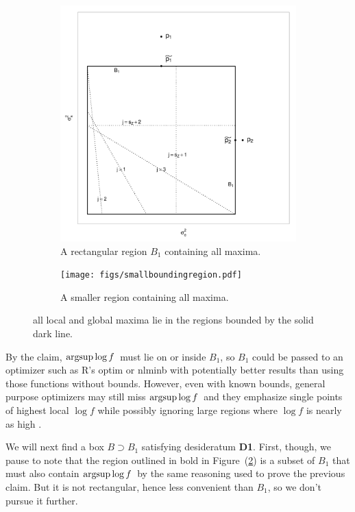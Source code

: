 \documentclass[ejs]{imsart}
\newcommand{\textcompute}{\textsf}
\newcommand{\R}{\textcompute{R}\xspace}
\newcommand{\RL}{f}
\newcommand{\logRL}{\log\RL}
\newcommand{\mrle}{$\argsup\log f$}
\newcommand{\argsup}{\operatornamewithlimits{argsup}}
\begin{document}
\begin{figure}[h]
  \begin{subfigure}{.5\textwidth}
	\centering
	\includegraphics[width=.8\linewidth]{figs/boundingbox.pdf}
	\caption{A rectangular region $B_1$ containing all maxima.}
	\label{fig:bigboundingbox}
  \end{subfigure}
  \begin{subfigure}{.5\textwidth}
	\centering
	\texttt{[image: figs/smallboundingregion.pdf]}
	\caption{A smaller region containing all maxima.}
	\label{fig:smallboundingbox}
  \end{subfigure}
  \caption{all local and global maxima lie in the regions bounded by the solid
                dark line.
               }
  \label{fig:boundingbox}
\end{figure}

By the claim, \mrle\ must lie on or inside $B_1$, so $B_1$ could be passed to an optimizer such as \R's \textsf{optim} or \textsf{nlminb} with potentially better results than using those functions without bounds.  However, even with known bounds, general purpose optimizers may still miss \mrle\ and they emphasize single points of highest local $\logRL$ while possibly ignoring large regions where $\logRL$ is nearly as high \citep[][Section 18.1.1]{hill:1965, hodges:2013}.

We will next find a box $B \supset B_1$ satisfying desideratum \textbf{D1}.  First, though, we pause to note that the region outlined in bold in Figure~(\ref{fig:smallboundingbox}) is a subset of $B_1$ that must also contain \mrle\ by the same reasoning used to prove the previous claim.  But it is not rectangular, hence less convenient than $B_1$, so we don't pursue it further.\\[5pt]
\end{document}
